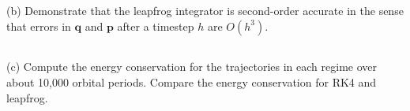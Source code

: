 \subsection{}
(b) Demonstrate that the leapfrog integrator is second-order accurate
in the sense that errors in $\mathbf{q}$ and $\mathbf{p}$ after a timestep $h$ are $O(h^3)$.



\subsection{}
(c) Compute the energy conservation for the trajectories in each regime
over about 10,000 orbital periods. Compare the energy conservation for RK4 and leapfrog.